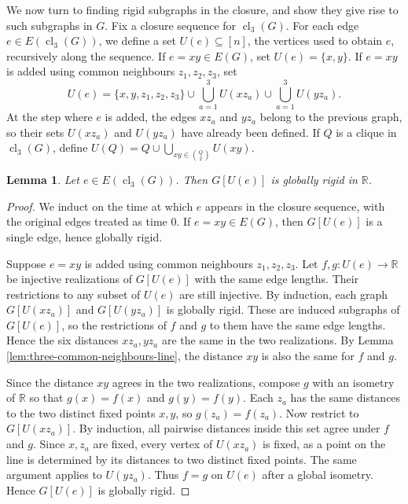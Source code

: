 \documentclass[fullpage,11pt]{article}
\theoremstyle{break}
\newtheorem{lemma}[theorem]{Lemma}
\theoremstyle{definition}
\theoremstyle{break}
\begin{document}
We now turn to finding rigid subgraphs in the closure, and show they give rise to such subgraphs in $G$. Fix a closure sequence for \(\operatorname{cl}_3(G)\). For each edge \(e\in E(\operatorname{cl}_3(G))\), we define a set \(U(e)\subseteq[n]\), the vertices used to obtain \(e\), recursively along the sequence. If \(e=xy\in E(G)\), set \(U(e)=\{x,y\}\). If \(e=xy\) is added using common neighbours \(z_1,z_2,z_3\), set
\[
    U(e)
    =
    \{x,y,z_1,z_2,z_3\}
    \cup
    \bigcup_{a=1}^3 U(xz_a)
    \cup
    \bigcup_{a=1}^3 U(yz_a).
\]
At the step where \(e\) is added, the edges \(xz_a\) and \(yz_a\) belong to the previous graph, so their sets \(U(xz_a)\) and \(U(yz_a)\) have already been defined. If \(Q\) is a clique in \(\operatorname{cl}_3(G)\), define
\(U(Q)=Q\cup\bigcup_{xy\in\binom{Q}{2}} U(xy)\).

\begin{lemma}\label{lem:support-globally-rigid}
Let \(e\in E(\operatorname{cl}_3(G))\). Then \(G[U(e)]\) is globally rigid in \(\mathbb R\).
\end{lemma}

\begin{proof}
We induct on the time at which \(e\) appears in the closure sequence, with the original edges treated as time \(0\). If \(e=xy\in E(G)\), then \(G[U(e)]\) is a single edge, hence globally rigid.

Suppose \(e=xy\) is added using common neighbours \(z_1,z_2,z_3\). Let \(f,g\colon U(e)\to\mathbb R\) be injective realizations of \(G[U(e)]\) with the same edge lengths. Their restrictions to any subset of \(U(e)\) are still injective. By induction, each graph \(G[U(xz_a)]\) and \(G[U(yz_a)]\) is globally rigid. These are induced subgraphs of \(G[U(e)]\), so the restrictions of \(f\) and \(g\) to them have the same edge lengths. Hence the six distances \(xz_a,yz_a\) are the same in the two realizations. By Lemma \ref{lem:three-common-neighbours-line}, the distance \(xy\) is also the same for \(f\) and \(g\).

Since the distance \(xy\) agrees in the two realizations, compose \(g\) with an isometry of \(\mathbb R\) so that \(g(x)=f(x)\) and \(g(y)=f(y)\). Each \(z_a\) has the same distances to the two distinct fixed points \(x,y\), so \(g(z_a)=f(z_a)\). Now restrict to \(G[U(xz_a)]\). By induction, all pairwise distances inside this set agree under \(f\) and \(g\). Since \(x,z_a\) are fixed, every vertex of \(U(xz_a)\) is fixed, as a point on the line is determined by its distances to two distinct fixed points. The same argument applies to \(U(yz_a)\). Thus \(f=g\) on \(U(e)\) after a global isometry. Hence \(G[U(e)]\) is globally rigid.
\end{proof}
\end{document}

